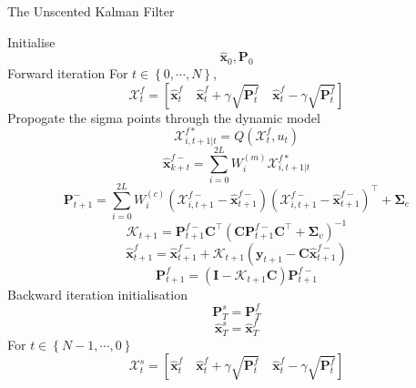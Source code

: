 \documentclass[12pt]{iopart}		%
\begin{document}
\begin{algorithm}
\caption{The Unscented Kalman Filter}\label{CPTEMDAlgorithm}
\begin{algorithmic}[1]
\State Initialise
\begin{equation*}
\hat{\mathbf x}_0, \mathbf P_0
\end{equation*}
\State Forward iteration
For $t \in \left\lbrace 0,\cdots, N\right\rbrace $,
\begin{equation*}
\mathcal X_t^f=[\hat{\mathbf x}_t^f \quad \hat{\mathbf x}_t^f+\gamma\sqrt{\mathbf P_t^f} \quad \hat{\mathbf x}_t^{f}-\gamma\sqrt{\mathbf P_t^f}]
\end{equation*}
Propogate the sigma points through the dynamic model
\begin{equation}
\mathcal X_{i,t+1|t}^{f*}=Q(\mathcal X_t^f,u_t)
\end{equation}
\begin{equation*}
 \hat{\mathbf x}_{k +t}^{f-}=\sum_{i=0}^{2L} W_i^{(m)}\mathcal X_{i,t+1|t}^{f*}
\end{equation*}
\begin{equation*}
 \mathbf P_{t +1}^-=\sum_{i=0}^{2L} W_i^{(c)}(\mathcal X_{i,t+1}^{f-}-\hat{\mathbf x}_{t +1}^{f-})(\mathcal X_{i,t+1}^{f-}-\hat{\mathbf x}_{t +1}^{f-})^\top+\boldsymbol \Sigma_e
\end{equation*}
\begin{equation*}
\mathcal K_{t+1}=\mathbf P_{t +1}^{f-}\mathbf C ^\top(\mathbf C \mathbf P_{t +1}^{f-}\mathbf C ^\top+\boldsymbol \Sigma_v)^{-1}
\end{equation*}
\begin{equation*}
\hat{\mathbf x}_{t+1}^{f}=\hat{\mathbf x}_{t+1}^{f-}+\mathcal K_{t+1}(\mathbf y_{t+1}-\mathbf C\hat{\mathbf x}_{t +1}^{f-})
\end{equation*}
\begin{equation*}
 \mathbf P_{t+1}^f=(\mathbf I - \mathcal K_{t+1}\mathbf C)\mathbf P_{t +1}^{f-}
\end{equation*}
\State Backward iteration
\State initialisation
\begin{equation}
 \mathbf P_T^s= \mathbf P_T^f
\end{equation}
\begin{equation}
\hat{\mathbf x}^s_T= \hat{\mathbf x}^f_T
\end{equation}
For $t \in \left\lbrace N-1, \cdots, 0 \right\rbrace $
\begin{equation*}
\mathcal X_t^s=[\hat{\mathbf x}_t^f \quad \hat{\mathbf x}_t^f+\gamma\sqrt{\mathbf P_t^f} \quad \hat{\mathbf x}_t^f-\gamma\sqrt{\mathbf P_t^f}]
\end{equation*}
\end{algorithmic}
\end{algorithm}
\end{document}
